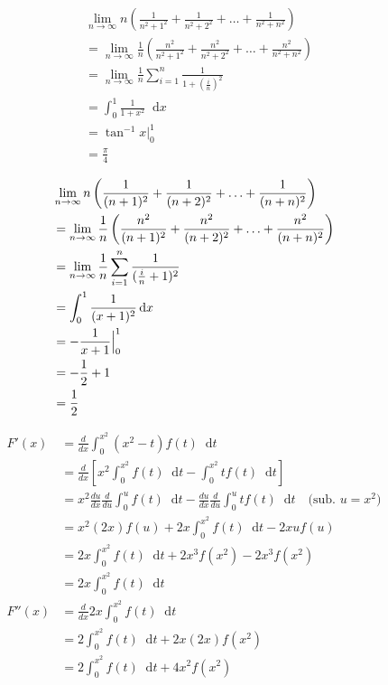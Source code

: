 \documentclass[12pt]{article}
\newcommand*\diff{\mathop{}\!\mathrm{d}}
\newenvironment{problem}[2][Problem]{\begin{trivlist}
\item[\hskip \labelsep {\bfseries #1}\hskip \labelsep {\bfseries #2.}]}{\end{trivlist}}
\begin{document}
\begin{problem}{8.a}
\end{problem}
\begin{align*}
&\lim_{n \to \infty} n \left( \frac{1}{n^2+1^2} + \frac{1}{n^2+2^2} + \ldots + \frac{1}{n^2+n^2} \right)\\
&= \lim_{n \to \infty} \frac{1}{n} \left( \frac{n^2}{n^2+1^2} + \frac{n^2}{n^2+2^2} + \ldots + \frac{n^2}{n^2+n^2} \right)\\
&= \lim_{n \to \infty} \frac{1}{n} \sum_{i=1}^{n} \frac{1}{1 + \left(\frac{i}{n}\right)^2}\\
&= \int_{0}^{1} \frac{1}{1 + x^2} \diff x\\
&= \tan^{-1}x \bigl|_{0}^{1}\\
&= \frac{\pi}{4}
\end{align*}
\filbreak

\begin{problem}{8.b}
\end{problem}
\begin{align*}
&\lim_{n \to \infty} n \left( \frac{1}{(n+1)^2} + \frac{1}{(n+2)^2} + \ldots + \frac{1}{(n+n)^2} \right)\\
&= \lim_{n \to \infty} \frac{1}{n} \left( \frac{n^2}{(n+1)^2} + \frac{n^2}{(n+2)^2} + \ldots + \frac{n^2}{(n+n)^2} \right)\\
&= \lim_{n \to \infty} \frac{1}{n} \sum_{i=1}^{n} \frac{1}{(\frac{i}{n} + 1)^2}\\
&= \int_{0}^{1} \frac{1}{(x+1)^2} \diff x\\
&= -\frac{1}{x+1} \Bigl|_{0}^{1}\\
&= -\frac{1}{2} + 1\\
&= \frac{1}{2}
\end{align*}
\filbreak

\begin{problem}{9}
\end{problem}
\begin{align*}
F'(x) &= \frac{d}{dx} \int_{0}^{x^2} (x^2-t) f(t) \diff t\\
&= \frac{d}{dx} \left[ x^2 \int_{0}^{x^2} f(t) \diff t - \int_{0}^{x^2} t f(t) \diff t \right]\\
&=  x^2 \frac{du}{dx}\frac{d}{du} \int_{0}^{u} f(t) \diff t - \frac{du}{dx}\frac{d}{du} \int_{0}^{u} t f(t) \diff t \quad \text{(sub. $u = x^2$)}\\
&=  x^2 (2x)f(u) +2x \int_{0}^{x^2} f(t) \diff t- 2x u f(u) \\
&=  2x \int_{0}^{x^2} f(t) \diff t + 2x^3 f(x^2) - 2x^3 f(x^2) \\
&=  2x \int_{0}^{x^2} f(t) \diff t \\
F''(x) &= \frac{d}{dx} 2x \int_{0}^{x^2} f(t) \diff t \\
&= 2 \int_{0}^{x^2} f(t) \diff t + 2x (2x) f(x^2) \\
&= 2 \int_{0}^{x^2} f(t) \diff t +  4x^2 f(x^2) \\
\end{align*}
\filbreak
\end{document}
